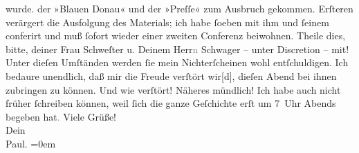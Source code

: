 \begin{ledgroupsized}[t]{13cm}
{{{                  wurde.}}}\label{K_L02652-1h} der »Blauen Donau« und der »Preſſe« zum Ausbruch gekommen. Erſteren verärgert die Ausfolgung des
               Materials; ich habe ſoeben mit ihm und ſeinem \label{K_L02652-2v}\label{K_L02652-2h} conferirt und
               muß ſofort wieder einer zweiten Conferenz beiwohnen. Theile dies, bitte, deiner Frau
                  Schweſter u. Deinem
                  Herr\textcolor{gray}{n}{ }Schwager – unter Discretion –
               mit! Unter dieſen Umſtänden {\pb}werden ſie mein
               Nichterſcheinen wohl entſchuldigen. Ich bedaure unendlich, daß mir die Freude
               verſtört wir{[}d{]}, dieſen Abend bei ihnen zubringen zu können. Und
               wie verſtört! Näheres mündlich!\pend
           \pstart
           Ich habe auch nicht früher ſchreiben können, weil ſich die ganze Geſchichte erſt um
                  7 Uhr Abends begeben hat\textcolor{gray}{.}\pend
           \pstart
           Viele Grüße!{\\[\baselineskip]}Dein{\\[\baselineskip]}\spacefill\mbox{Paul.}\pend
           \leftskip=0em{}
         
         \endnumbering{}\end{ledgroupsized}  \newcommand{\dateiname}{L02652}\newcommand{\titel}{Paul Goldmann an Arthur Schnitzler, 20. 12. 1890}\newcommand{\editorInnen}{Martin Anton Müller und Laura Untner}
      